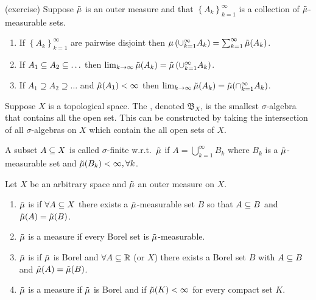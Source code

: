 \begin{thm}(exercise)
  Suppose $\tilde{\mu}$ is an outer measure and that $\left\{ A_k
  \right\}_{k=1}^\infty$ is a collection of $\tilde{\mu}$-measurable sets.
  \begin{enumerate}
    \item If $\left\{ A_k\right\}_{k=1}^\infty$ are pairwise disjoint then
      $\mu\left( \cup_{k=1}^\infty A_k \right) =
      \sum_{k=1}^\infty\tilde{\mu}(A_k)$.
    \item If $A_1\subseteq A_2 \subseteq \ldots$ then
      $\lim_{k\to \infty}\tilde{\mu}(A_k) = \tilde{\mu}\left( \cup_{k=1}^\infty A_k
      \right)$.
    \item If $A_1 \supseteq A_2 \supseteq \ldots$ and $\tilde{\mu}(A_1) <
      \infty$ then $\lim_{k\to \infty}\tilde{\mu}(A_k) = \tilde{\mu}(\cap_{k=1}^\infty
      A_k)$.
  \end{enumerate}
\end{thm}

\begin{defn}
  Suppose $X$ is a topological space. The , denoted $\mathfrak{B}_X$, is the smallest $\sigma$-algebra that contains all
  the open set. This can be constructed by taking the intersection of
  all $\sigma$-algebras on $X$ which contain the all open sets of
  $X$.
\end{defn}

\begin{defn}
  A subset $A\subseteq X$ is called $\sigma$-finite w.r.t.\ $\tilde{\mu}$ if
  $A=\bigcup_{k=1}^\infty B_k$ where $B_k$ is a $\tilde{\mu}$-measurable set and
  $\tilde{\mu}(B_k)<\infty, \forall k$.
\end{defn}

\begin{defn}\mbox{}
  Let $X$ be an arbitrary space and $\tilde{\mu}$ an outer measure on $X$.
  \begin{enumerate}
    \item $\tilde{\mu}$ is  if $\forall A\subseteq X$ there exists a
      $\tilde{\mu}$-measurable set $B$ so that $A\subseteq B$ and $\tilde{\mu}(A) = \tilde{\mu}(B)$.
    \item $\tilde{\mu}$ is a  measure if every Borel set is
      $\tilde{\mu}$-measurable.
    \item $\tilde{\mu}$ is  if $\tilde{\mu}$ is Borel and
      $\forall A\subseteq \mathbb{R}$ (or $X$) there exists a Borel set
      $B$ with $A\subseteq B$ and $\tilde{\mu}(A)=\tilde{\mu}(B)$.
    \item $\tilde{\mu}$ is a  measure if $\tilde{\mu}$ is Borel and if
      $\tilde{\mu}(K)<\infty$ for every compact set $K$.
  \end{enumerate}
\end{defn}

